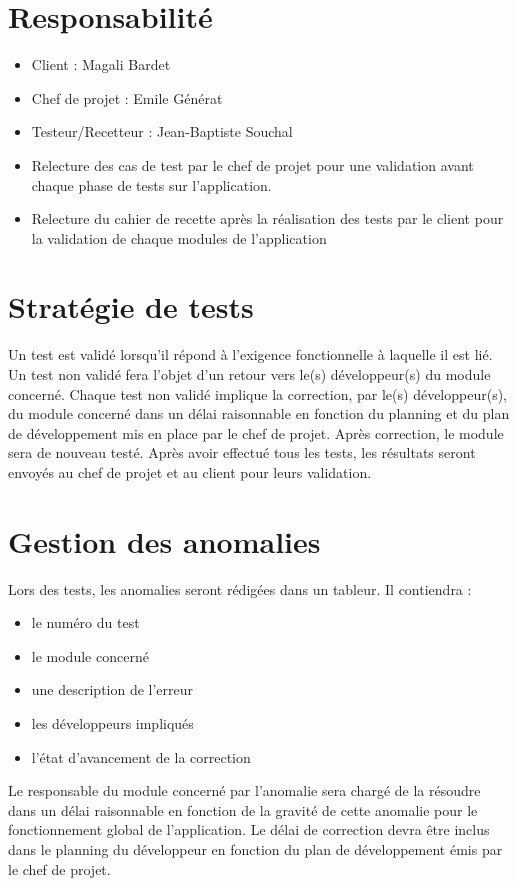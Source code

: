 \documentclass[a4paper,11pt,french]{article}
\begin{document}
\section{Responsabilité}

\begin{itemize}
  \item Client : Magali Bardet
  \item Chef de projet : Emile Générat
  \item Testeur/Recetteur : Jean-Baptiste Souchal
  \item Relecture des cas de test par le chef de projet pour une validation avant 
  chaque phase de tests sur l'application.
  \item Relecture du cahier de recette après la réalisation des tests par le 
  client pour la validation de chaque modules de l'application
\end{itemize}

\section{Stratégie de tests}
Un test est validé lorsqu’il répond à l’exigence fonctionnelle à laquelle il est lié.
Un test non validé fera l’objet d’un retour vers le(s) développeur(s) du module concerné.
Chaque test non validé implique la correction, par le(s) développeur(s), du module concerné dans
un délai raisonnable en fonction du planning et du plan de développement mis en place par le chef de
projet. Après correction, le module sera de nouveau testé. Après avoir effectué tous les tests, les
résultats seront envoyés au chef de projet et au client pour leurs validation.

\section{Gestion des anomalies}
Lors des tests, les anomalies seront rédigées dans un tableur. Il contiendra :

\begin{itemize}
  \item le numéro du test
  \item le module concerné
  \item une description de l'erreur
  \item les développeurs impliqués
  \item l’état d’avancement de la correction
\end{itemize}

Le responsable du module concerné par l’anomalie sera chargé de la résoudre dans un
  délai raisonnable en fonction de la gravité de cette anomalie pour le fonctionnement global
  de l’application. Le délai de correction devra être inclus dans le planning du développeur en fonction
  du plan de développement émis par le chef de projet.
\end{document}

